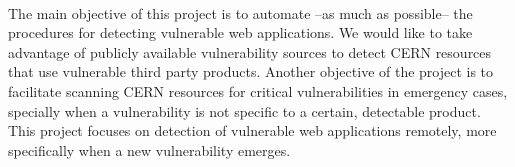 \paragraph{}
The main objective of this project is to automate --as much as possible-- the procedures for detecting vulnerable web applications. We would like to take advantage of publicly available vulnerability sources to detect CERN resources that use vulnerable third party products. Another objective of the project is to facilitate scanning CERN resources for critical vulnerabilities in emergency cases, specially when a vulnerability is not specific to a certain, detectable product. This project focuses on detection of vulnerable web applications remotely, more specifically when a new vulnerability emerges.

























